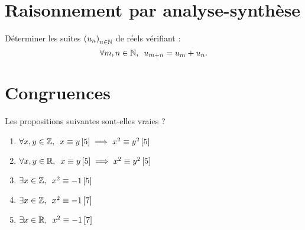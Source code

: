 \begin{corr}
\end{corr}

\section{Raisonnement par analyse-synthèse}

\begin{exo}[Exercice 7]
Déterminer les suites \(\left(u_n\right)_{n\in\mathbb{N}}\) de réels vérifiant : \[\quantifs{\forall m,n\in\N}u_{m+n}=u_m+u_n.\]
\end{exo}

\begin{corr}
\end{corr}

\section{Congruences}

\begin{exo}[Exercice 8]
Les propositions suivantes sont-elles vraies ?

\begin{enumerate}
\item \(\quantifs{\forall x,y\in\Z}x\equiv y\croch{5}\imp x^2\equiv y^2\croch{5}\) \\

\item \(\quantifs{\forall x,y\in\R}x\equiv y\croch{5}\imp x^2\equiv y^2\croch{5}\) \\

\item \(\quantifs{\exists x\in\Z}x^2\equiv-1\croch{5}\) \\

\item \(\quantifs{\exists x\in\Z}x^2\equiv-1\croch{7}\) \\

\item \(\quantifs{\exists x\in\R}x^2\equiv-1\croch{7}\)
\end{enumerate}
\end{exo}

\begin{corr}
\end{corr}

